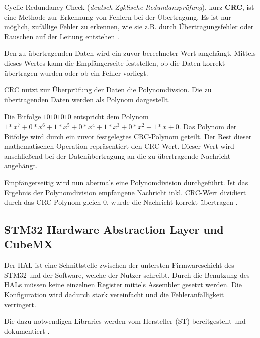 Cyclic Redundancy Check (\textit{deutsch Zyklische Redundanzprüfung}), kurz \textbf{CRC}, ist eine Methode zur Erkennung von Fehlern bei 
der Übertragung. Es ist nur möglich, zufällige Fehler zu erkennen, wie sie z.B. durch Übertragungsfehler oder Rauschen auf der Leitung entstehen \citep{IK_VL}.

\smallskip

Den zu übertragenden Daten wird ein zuvor berechneter Wert angehängt. Mittels dieses Wertes kann die Empfängerseite feststellen, ob die Daten korrekt 
übertragen wurden oder ob ein Fehler vorliegt. 

\smallskip

CRC nutzt zur Überprüfung der Daten die Polynomdivsion. Die zu übertragenden Daten werden als Polynom dargestellt.

\smallskip

Die Bitfolge \begin{math}
    10101010
\end{math}  entspricht dem Polynom \begin{math}
    1*x^7+0*x^6+1*x^5+0*x^4+1*x^3+0*x^2+1*x+0
\end{math}.
Das Polynom der Bitfolge wird durch ein zuvor festgelegtes CRC-Polynom geteilt. Der Rest dieser mathematischen Operation repräsentiert den CRC-Wert. Dieser Wert
wird anschließend bei der Datenübertragung an die zu übertragende Nachricht angehängt.

\smallskip

Empfängerseitig wird nun abermals eine Polynomdivision durchgeführt. Ist das Ergebnis der Polynomdivision empfangene Nachricht inkl. CRC-Wert dividiert durch das
CRC-Polynom gleich 0, wurde die Nachricht korrekt übertragen \citep{IK_VL}.


\subsection{STM32 Hardware Abstraction Layer und CubeMX}

Der \ac{HAL} ist eine Schnittstelle zwischen der untersten Firmwareschicht des STM32 und der Software, welche der Nutzer schreibt. Durch die Benutzung des
\acp{HAL} müssen keine einzelnen Register mittels Assembler gesetzt werden. Die Konfiguration wird dadurch stark vereinfacht und die Fehleranfälligkeit verringert.

\smallskip

Die dazu notwendigen Libraries werden vom Hersteller (ST) bereitgestellt und dokumentiert \citep{HAL_Description}. 

